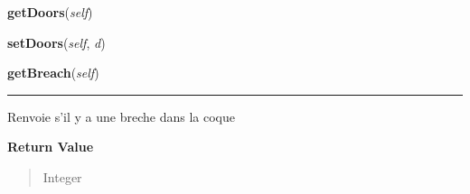     \label{room:Room:getDoors}

    \vspace{0.5ex}

\hspace{.8\funcindent}\begin{boxedminipage}{\funcwidth}

    \raggedright \textbf{getDoors}(\textit{self})

\setlength{\parskip}{2ex}
\setlength{\parskip}{1ex}
    \end{boxedminipage}

    \label{room:Room:setDoors}

    \vspace{0.5ex}

\hspace{.8\funcindent}\begin{boxedminipage}{\funcwidth}

    \raggedright \textbf{setDoors}(\textit{self}, \textit{d})

\setlength{\parskip}{2ex}
\setlength{\parskip}{1ex}
    \end{boxedminipage}

    \label{room:Room:getBreach}

    \vspace{0.5ex}

\hspace{.8\funcindent}\begin{boxedminipage}{\funcwidth}

    \raggedright \textbf{getBreach}(\textit{self})

    \vspace{-1.5ex}

    \rule{\textwidth}{0.5\fboxrule}
\setlength{\parskip}{2ex}
    Renvoie s'il y a une breche dans la coque

\setlength{\parskip}{1ex}
      \textbf{Return Value}
    \vspace{-1ex}

      \begin{quote}
      Integer

      \end{quote}

    \end{boxedminipage}

